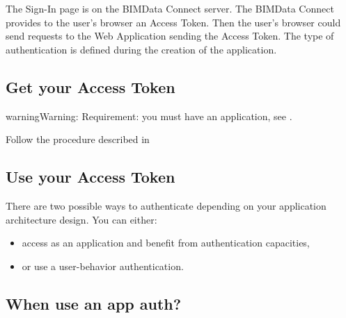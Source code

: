 \documentclass[a4paper,12pt,english]{sphinxmanual}
\begin{document}
The Sign-In page is on the BIMData Connect server. The BIMData Connect provides to the user’s browser an Access Token.
Then the user’s browser could send requests to the Web Application sending the Access Token.
The type of authentication is defined during the creation of the application.




\subsection{Get your Access Token}
\label{\detokenize{guide/authentication_bimdata_connect:get-your-access-token}}
\begin{sphinxadmonition}{warning}{Warning:}
Requirement: you must have an application, see .
\end{sphinxadmonition}

Follow the procedure described in 




\subsection{Use your Access Token}
\label{\detokenize{guide/authentication_bimdata_connect:use-your-access-token}}
There are two possible ways to authenticate depending on your application architecture design.
You can either:
\begin{itemize}
\item {} 
access as an application and benefit from authentication capacities,

\item {} 
or use a user-behavior authentication.

\end{itemize}


\subsection{When use an app auth?}
\label{\detokenize{guide/authentication_bimdata_connect:when-use-an-app-auth}}
\end{document}
